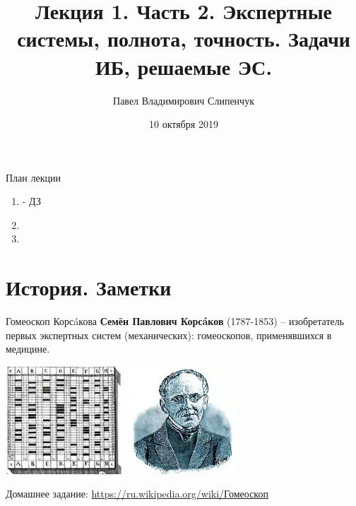 


\title{Лекция 1. Часть 2. Экспертные системы, полнота, точность. Задачи ИБ, решаемые ЭС.}
\date{10 октября 2019}
\author{Павел Владимирович Слипенчук}


  \maketitle
    
  \begin{frame}{План лекции}
    \begin{enumerate}
    \item {} - ДЗ
    \item {}
    \item {}
	\end{enumerate}
 \end{frame}
 
 \section{История. Заметки}\label{section:history_remarks}
  
  \begin{frame}{Гомеоскоп Корсáкова}
    \textbf{Семён Павлович Корсáков}
    (1787-1853) 
    -- изобретатель первых экспертных систем 
    (механических): гомеоскопов, применявшихся в медицине.  
    \begin{center}
    		\includegraphics[width=4.5cm]{../pic/gomeoskop.png}\centering
    		\includegraphics[width=4cm]{../pic/korsakov.png}\centering
    \end{center}
    Домашнее задание: \url{https://ru.wikipedia.org/wiki/Гомеоскоп}
  \end{frame}
  
